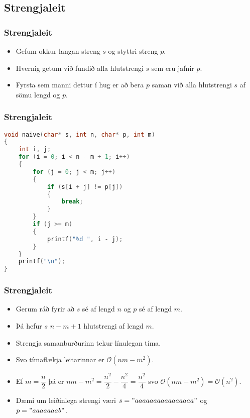 \documentclass{beamer}
\begin{document}
\subsection{Strengjaleit}

\begin{frame}
	\frametitle{Strengjaleit}
	\begin{itemize}
		\item<1-> Gefum okkur langan streng $s$ og styttri streng $p$.
		\item<2-> Hvernig getum við fundið alla hlutstrengi $s$ sem eru jafnir $p$.
		\item<3-> Fyrsta sem manni dettur í hug er að bera $p$ saman við alla hlutstrengi
			$s$ af sömu lengd og $p$.
	\end{itemize}
\end{frame}

\begin{frame}[fragile]
	\frametitle{Strengjaleit}
	\tiny
	\begin{lstlisting}[language=C]
void naive(char* s, int n, char* p, int m)
{
	int i, j;
	for (i = 0; i < n - m + 1; i++)
	{
		for (j = 0; j < m; j++)
		{
			if (s[i + j] != p[j])
			{
				break;
			}
		}
		if (j >= m)
		{
			printf("%d ", i - j);
		}
	}
	printf("\n");
}
	\end{lstlisting}
\end{frame}

\begin{frame}
	\frametitle{Strengjaleit}
	\begin{itemize}
		\item<1-> Gerum ráð fyrir að $s$ sé af lengd $n$ og $p$ sé af lengd $m$.
		\item<2-> Þá hefur $s$ $n - m + 1$ hlutstrengi af lengd $m$.
		\item<3-> Strengja samanburðurinn tekur línulegan tíma.
		\item<4-> Svo tímaflækja leitarinnar er $\mathcal{O}(nm - m^2)$.
		\item<5-> Ef $m = \dfrac{n}{2}$ þá er $nm - m^2 = \dfrac{n^2}{2} - \dfrac{n^2}{4} = \dfrac{n^2}{4}$
			svo $\mathcal{O}(nm - m^2) = \mathcal{O}(n^2)$.
		\item<6-> Dæmi um leiðinlega strengi væri $s = "aaaaaaaaaaaaaaaa"$ og $p = "aaaaaaab"$.
	\end{itemize}
\end{frame}
\end{document}
